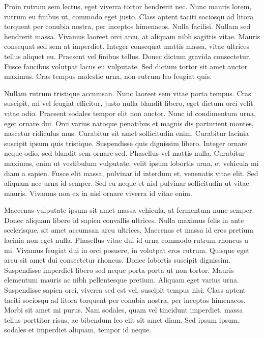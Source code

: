 Proin rutrum sem lectus, eget viverra tortor hendrerit nec. Nunc mauris lorem, rutrum eu finibus ut, commodo eget justo. Class aptent taciti sociosqu ad litora torquent per conubia nostra, per inceptos himenaeos. Nulla facilisi. Nullam sed hendrerit massa. Vivamus laoreet orci arcu, at aliquam nibh sagittis vitae. Mauris consequat sed sem at imperdiet. Integer consequat mattis massa, vitae ultrices tellus aliquet eu. Praesent vel finibus tellus. Donec dictum gravida consectetur. Fusce faucibus volutpat lacus eu vulputate. Sed dictum tortor sit amet auctor maximus. Cras tempus molestie urna, non rutrum leo feugiat quis.

Nullam rutrum tristique accumsan. Nunc laoreet sem vitae porta tempus. Cras suscipit, mi vel feugiat efficitur, justo nulla blandit libero, eget dictum orci velit vitae odio. Praesent sodales tempor elit non auctor. Nunc id condimentum urna, eget ornare dui. Orci varius natoque penatibus et magnis dis parturient montes, nascetur ridiculus mus. Curabitur sit amet sollicitudin enim. Curabitur lacinia suscipit ipsum quis tristique. Suspendisse quis dignissim libero. Integer ornare neque odio, sed blandit sem ornare sed. Phasellus vel mattis nulla. Curabitur maximus, enim ut vestibulum vulputate, velit ipsum lobortis urna, et vehicula mi diam a sapien. Fusce elit massa, pulvinar id interdum et, venenatis vitae elit. Sed aliquam nec urna id semper. Sed eu neque et nisl pulvinar sollicitudin ut vitae mauris. Vivamus non ex in nisl ornare viverra id vitae enim.

Maecenas vulputate ipsum sit amet massa vehicula, at fermentum nunc semper. Donec aliquam libero id sapien convallis ultrices. Nulla maximus felis in ante scelerisque, sit amet accumsan arcu ultrices. Maecenas et massa id eros pretium lacinia non eget nulla. Phasellus vitae dui id urna commodo rutrum rhoncus a mi. Vivamus feugiat dui in orci posuere, in volutpat eros rutrum. Quisque eget arcu sit amet dui consectetur rhoncus. Donec lobortis suscipit dignissim. Suspendisse imperdiet libero sed neque porta porta ut non tortor. Mauris elementum mauris ac nibh pellentesque pretium. Aliquam eget varius urna. Suspendisse sapien orci, viverra sed est vel, suscipit tempus nisi. Class aptent taciti sociosqu ad litora torquent per conubia nostra, per inceptos himenaeos. Morbi sit amet mi purus. Nam sodales, quam vel tincidunt imperdiet, massa tellus porttitor risus, ac bibendum leo elit sit amet diam. Sed ipsum ipsum, sodales et imperdiet aliquam, tempor id neque.

